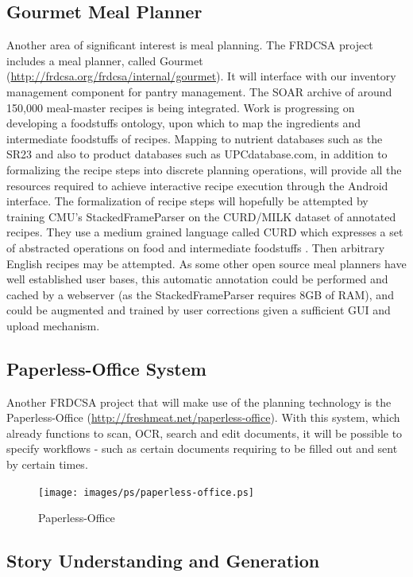 \documentclass[letterpaper]{article}
\begin{document}
\subsection{Gourmet Meal Planner}

Another area of significant interest is meal planning.  The FRDCSA
project includes a meal planner, called Gourmet
(\url{http://frdcsa.org/frdcsa/internal/gourmet}). It will interface
with our inventory management component for pantry management.  The
SOAR archive of around 150,000 meal-master recipes is being
integrated.  Work is progressing on developing a foodstuffs ontology,
upon which to map the ingredients and intermediate foodstuffs of
recipes.  Mapping to nutrient databases such as the SR23 and also to
product databases such as UPCdatabase.com, in addition to formalizing
the recipe steps into discrete planning operations, will provide all
the resources required to achieve interactive recipe execution through
the Android interface.  The formalization of recipe steps will
hopefully be attempted by training CMU's StackedFrameParser on the
CURD/MILK dataset of annotated recipes.  They use a medium grained
language called CURD which expresses a set of abstracted operations on
food and intermediate foodstuffs \cite{tasse2008}.  Then arbitrary
English recipes may be attempted.  As some other open source meal
planners have well established user bases, this automatic annotation
could be performed and cached by a webserver (as the
StackedFrameParser requires 8GB of RAM), and could be augmented and
trained by user corrections given a sufficient GUI and upload
mechanism.

\subsection{Paperless-Office System}

Another FRDCSA project that will make use of the planning technology
is the Paperless-Office (\url{http://freshmeat.net/paperless-office}).
With this system, which already functions to scan, OCR, search and
edit documents, it will be possible to specify workflows - such as
certain documents requiring to be filled out and sent by certain
times.
\begin{figure}[h!]
  \centering
      \texttt{[image: images/ps/paperless-office.ps]}
  \caption{Paperless-Office}
\end{figure}

\subsection{Story Understanding and Generation}
\end{document}

